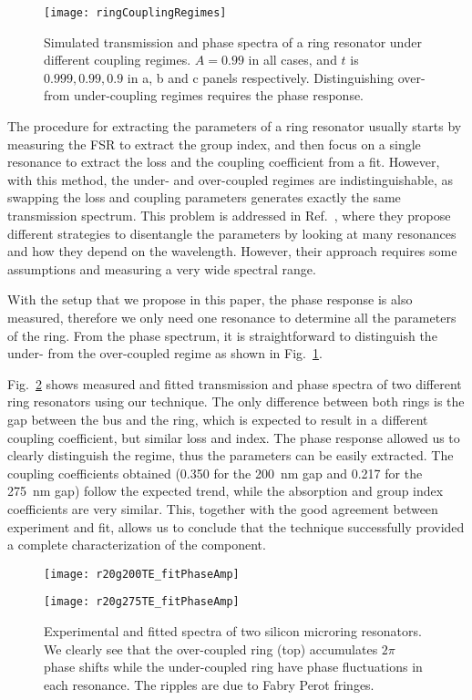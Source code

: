 \begin{figure}[htb]
    \centering
    \texttt{[image: ringCouplingRegimes]}
    \caption{Simulated transmission and phase spectra of a ring resonator under different coupling regimes.
    $A= 0.99$ in all cases, and $t$ is $0.999, 0.99, 0.9$ in a, b and c panels respectively.
    Distinguishing over- from under-coupling regimes requires the phase response.}
    \label{fig:ringDifferentCoupling}
\end{figure}



The procedure for extracting the parameters of a ring resonator usually starts by measuring the FSR to extract the group index, and then focus on a single resonance to extract the loss and the coupling coefficient from a fit.
However, with this method, the under- and over-coupled regimes are indistinguishable, as swapping the loss and coupling parameters generates exactly the same transmission spectrum.
This problem is addressed in Ref.~\cite{McKinnon2009}, where they propose different strategies to disentangle the parameters by looking at many resonances and how they depend on the wavelength.
However, their approach requires some assumptions and measuring a very wide spectral range.
 
With the setup that we propose in this paper, the phase response is also measured, therefore we only need one resonance to determine all the parameters of the ring.
From the phase spectrum, it is straightforward to distinguish the under- from the over-coupled regime as shown in Fig.~\ref{fig:ringDifferentCoupling}.

Fig.~\ref{fig:overcoupled} shows measured and fitted transmission and phase spectra of two different ring resonators using our technique.
The only difference between both rings is the gap between the bus and the ring, which is expected to result in a different coupling coefficient, but similar loss and index.
The phase response allowed us to clearly distinguish the regime, thus the parameters can be easily extracted.
The coupling coefficients obtained (0.350 for the 200~nm gap and 0.217 for the 275~nm gap) follow the expected trend, while the absorption and group index coefficients are very similar.
This, together with the good agreement between experiment and fit, allows us to conclude that the technique successfully provided a complete characterization of the component.



\begin{figure}[htb]
  \centerline{\texttt{[image: r20g200TE\_fitPhaseAmp]}}
  \centerline{\texttt{[image: r20g275TE\_fitPhaseAmp]}}
   \caption{Experimental and fitted spectra of two silicon microring resonators. We clearly see that the over-coupled ring (top) accumulates $2\pi$ phase shifts while the under-coupled ring have phase fluctuations in each resonance. The ripples are due to Fabry Perot fringes.}
  \label{fig:overcoupled} %
\end{figure}


